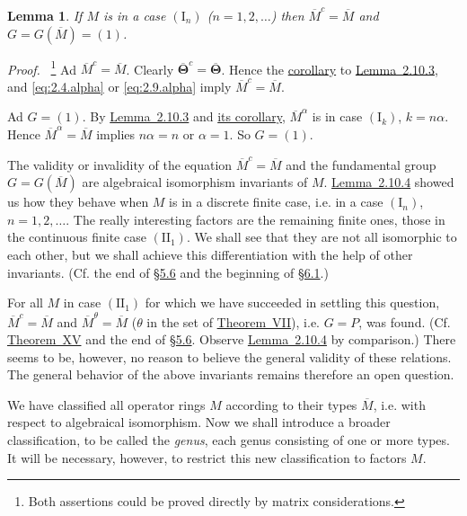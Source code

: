 \documentclass[b5paper,twoside]{article}
\newcommand{\secref}[2]{\hyperref[#1]{\mbox{\S#2}}}
\newcommand{\thmref}[2]{\hyperref[#1]{\mbox{Theorem~#2}}}
\newcommand{\lemref}[2]{\hyperref[#1]{\mbox{Lemma~#2}}}
\theoremstyle{mvnplain}
\newtheorem{lemma}{Lemma}[section]
\renewenvironment{proof}[1][Proof]{%
  \par\addvspace{0.35\baselineskip}%
  \noindent\textit{#1.}\ \normalfont\ignorespaces
}{%
  \par\addvspace{0.35\baselineskip}%
}
\newcommand{\M}{\mathbf M}
\def\M{M}%
\def\mathfrak#1{#1}%
\begin{document}
\begin{lemma}\label{lem:2.10.4}
If $\M$ is in a case $(\mathrm I_n)$ ($n=1,2,\ldots$) then
$\overline{\M}^{c}=\overline{\M}$ and
$\mathfrak G=\mathfrak G(\overline{\M})=(1)$.
\end{lemma}
\begin{proof}\footnote{Both assertions could be proved directly by matrix
considerations.}
Ad $\overline{\M}^{c}=\overline{\M}$.  Clearly
$\overline{\boldsymbol\Theta}^{c}=\overline{\boldsymbol\Theta}$.  Hence the
\hyperref[cor:2.10.3]{corollary} to \lemref{lem:2.10.3}{2.10.3}, and
\eqref{eq:2.4.alpha} or
\eqref{eq:2.9.alpha} imply $\overline{\M}^{c}=\overline{\M}$.

Ad $\mathfrak G=(1)$.  By \lemref{lem:2.10.3}{2.10.3} and
\hyperref[cor:2.10.3]{its corollary},
$\overline{\M}^{\alpha}$ is in case $(\mathrm I_k)$, $k=n\alpha$.  Hence
$\overline{\M}^{\alpha}=\overline{\M}$ implies $n\alpha=n$ or
$\alpha=1$.  So $\mathfrak G=(1)$.
\end{proof}

The validity or invalidity of the equation
$\overline{\M}^{c}=\overline{\M}$ and the fundamental group
$\mathfrak G=\mathfrak G(\overline{\M})$ are algebraical isomorphism
invariants of $\M$.  \lemref{lem:2.10.4}{2.10.4} showed us how they behave
when $\M$ is in a discrete finite case, i.e. in a case $(\mathrm I_n)$,
$n=1,2,\ldots$.  The really interesting factors are the remaining finite
ones, those in the continuous finite case $(\mathrm{II}_1)$.  We shall see
that they are not all isomorphic to each other, but we shall achieve this
differentiation with the help of other invariants.  (Cf. the end of
\secref{sec:5.6}{5.6} and the beginning of \secref{sec:6.1}{6.1}.)

For all $\M$ in case $(\mathrm{II}_1)$ for which we have succeeded in
settling this question, $\overline{\M}^{c}=\overline{\M}$ and
$\overline{\M}^{\theta}=\overline{\M}$ ($\theta$ in the set of
\thmref{thm:VII}{VII}), i.e. $\mathfrak G=P$, was found.  (Cf.
\thmref{thm:XV}{XV} and the end of \secref{sec:5.6}{5.6}.  Observe
\lemref{lem:2.10.4}{2.10.4} by comparison.)  There seems to be, however, no
reason to believe the general validity of these relations.  The general
behavior of the above invariants remains therefore an open question.


We have classified all operator rings \(\M\) according to their types
\(\overline{\M}\), i.e. with respect to algebraical isomorphism. Now we shall
introduce a broader classification, to be called the \emph{genus}, each genus
consisting of one or more types. It will be necessary, however, to restrict this
new classification to factors \(\M\).
\end{document}
